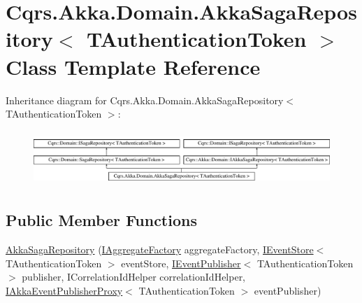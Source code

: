 \hypertarget{classCqrs_1_1Akka_1_1Domain_1_1AkkaSagaRepository}{}\section{Cqrs.\+Akka.\+Domain.\+Akka\+Saga\+Repository$<$ T\+Authentication\+Token $>$ Class Template Reference}
\label{classCqrs_1_1Akka_1_1Domain_1_1AkkaSagaRepository}
Inheritance diagram for Cqrs.\+Akka.\+Domain.\+Akka\+Saga\+Repository$<$ T\+Authentication\+Token $>$\+:\begin{figure}[H]
\begin{center}
\leavevmode
\includegraphics[height=2.105263cm]{classCqrs_1_1Akka_1_1Domain_1_1AkkaSagaRepository}
\end{center}
\end{figure}
\subsection*{Public Member Functions}
\begin{DoxyCompactItemize}
\item 
\hyperlink{classCqrs_1_1Akka_1_1Domain_1_1AkkaSagaRepository_a8297f64e2b7a7be7bcc999c89dcece05_a8297f64e2b7a7be7bcc999c89dcece05}{Akka\+Saga\+Repository} (\hyperlink{interfaceCqrs_1_1Domain_1_1Factories_1_1IAggregateFactory}{I\+Aggregate\+Factory} aggregate\+Factory, \hyperlink{interfaceCqrs_1_1Events_1_1IEventStore}{I\+Event\+Store}$<$ T\+Authentication\+Token $>$ event\+Store, \hyperlink{interfaceCqrs_1_1Events_1_1IEventPublisher}{I\+Event\+Publisher}$<$ T\+Authentication\+Token $>$ publisher, I\+Correlation\+Id\+Helper correlation\+Id\+Helper, \hyperlink{interfaceCqrs_1_1Akka_1_1Events_1_1IAkkaEventPublisherProxy}{I\+Akka\+Event\+Publisher\+Proxy}$<$ T\+Authentication\+Token $>$ event\+Publisher)
\end{DoxyCompactItemize}
